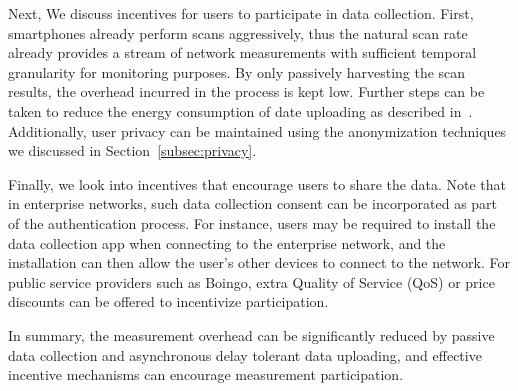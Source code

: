 Next, We discuss incentives for users to participate in data collection. First,
smartphones already perform \wifi{} scans aggressively, thus the natural scan
rate already provides a stream of network measurements with sufficient temporal
granularity for monitoring purposes. By only passively harvesting the scan
results, the overhead incurred in the process is kept low. Further steps can
be taken to reduce the energy consumption of date
uploading as described in~\cite{liu2015appatp,zhang5etrain}.  Additionally, user privacy can be
maintained using the anonymization techniques we discussed in
Section~\ref{subsec:privacy}.

Finally, we look into incentives that encourage users to share the data. Note that
in enterprise networks, such data collection consent can be incorporated as part
of the authentication process. For instance, users may be required to install
the data collection app when connecting to the enterprise network, and the
installation can then allow the user's other devices to connect to the network.
For public \wifi{} service providers such as Boingo, extra Quality
of Service (QoS) or price discounts can be offered to incentivize
participation.

In summary, the measurement overhead can be significantly reduced by passive
data collection and asynchronous delay tolerant data uploading, and effective
incentive mechanisms can encourage measurement participation.

